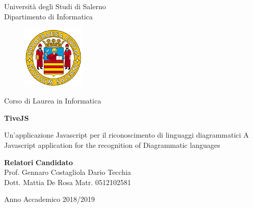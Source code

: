 \begin{titlepage}
\begin{center}


{\large Università degli Studi di Salerno}\\[0.2truecm]
{\large Dipartimento di Informatica}\\


\begin{figure}[htbp]
\centering
\includegraphics[height=3cm, width=3cm]{Figure/logounisa.png}
\end{figure}


{\large Corso di Laurea in Informatica}

\vfill\vfill

{\Huge \textbf{TiveJS}}

\vspace{0.2cm}

{\LARGE Un'applicazione Javascript per il riconoscimento di linguaggi diagrammatici} 
\newline \newline
{\LARGE A Javascript application for the recognition of Diagrammatic languages}

\vfill\vfill

{\bf Relatori}              \hfill {\bf Candidato}  \\
Prof. Gennaro Costagliola   \hfill Dario Tecchia  \\
Dott. Mattia De Rosa        \hfill Matr. 0512102581 \\

\vfill
\hrulefill 

Anno Accademico 2018/2019

\end{center}
\end{titlepage}